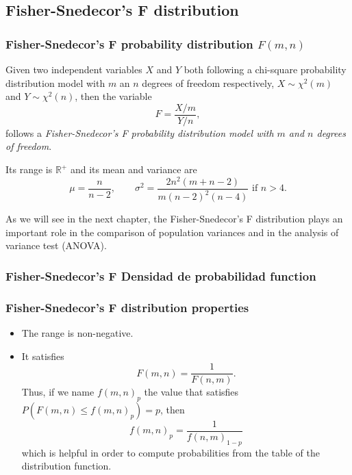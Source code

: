 \subsection{Fisher-Snedecor's F distribution}

\begin{frame}
\frametitle{Fisher-Snedecor's F probability distribution $F(m,n)$}
\begin{definition}
Given two independent variables $X$ and $Y$ both following a chi-square probability distribution model with $m$ an $n$
degrees of freedom respectively,  $X\sim \chi^2(m)$ and $Y\sim \chi^2(n)$, then the variable
\[
F = \frac{X/m}{Y/n},
\]
follows a \emph{Fisher-Snedecor's F probability distribution model with $m$ and $n$ degrees of freedom}.
\end{definition}

Its range is $\mathbb{R}^+$ and its mean and variance are
\[
\mu = \frac{n}{n-2}, \qquad \sigma^2 =\frac{2n^2(m+n−2)}{m(n-2)^2(n-4)}\mbox{ if $n>4$}.
\]

As we will see in the next chapter, the Fisher-Snedecor's F distribution plays an important role in the comparison of population variances and in the analysis of variance test (ANOVA).
\end{frame}


\begin{frame}
\frametitle{Fisher-Snedecor's F Densidad de probabilidad function}

\begin{center}
\end{center}
\end{frame}


\begin{frame}
\frametitle{Fisher-Snedecor's F distribution properties}
\begin{itemize}
\item The range is non-negative.
\item It satisfies
\[
F(m,n) =\frac{1}{F(n,m)}.
\]
Thus, if we name $f(m,n)_p$ the value that satisfies $P(F(m,n)\leq f(m,n)_p)=p$, then
\[
f(m,n)_p =\frac{1}{f(n,m)_{1-p}}
\]
which is helpful in order to compute probabilities from the table of the distribution function.
\end{itemize}

\end{frame}

